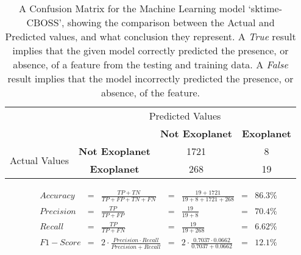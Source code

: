 
    \renewcommand{\arraystretch}{2}
    \renewcommand{\tabcolsep}{20.25pt}
    \vspace{-0.5cm}
    \begin{table}[ht]
    \begin{tabular}{cccc}
     & \multicolumn{3}{c}{Predicted Values} \\ \cline{3-4}
     & \multicolumn{1}{c|}{} & \multicolumn{1}{c|}{\textbf{Not Exoplanet}} & \multicolumn{1}{c|}{\textbf{Exoplanet}} \\ \cline{2-4}
    \multicolumn{1}{c|}{\multirow{2}{2.0cm}{Actual Values}} & \multicolumn{1}{c|}{\textbf{Not Exoplanet}} & \multicolumn{1}{c|}{1721} & \multicolumn{1}{c|}{8} \\ \cline{2-4}
    \multicolumn{1}{c|}{} & \multicolumn{1}{c|}{\textbf{Exoplanet}} & \multicolumn{1}{c|}{268} & \multicolumn{1}{c|}{19} \\ \cline{2-4}
    \end{tabular}
    \caption{A Confusion Matrix for the Machine Learning model `sktime-CBOSS', showing the comparison between the Actual and Predicted values, and what conclusion they represent. A \emph{True} result implies that the given model correctly predicted the presence, or absence, of a feature from the testing and training data. A \emph{False} result implies that the model incorrectly predicted the presence, or absence, of the feature.}
    \label{tab:sktime-CBOSSconfusionmatrix}
    \end{table}
    \vspace{-0.75cm}
    \label{eq:metrics-sktime-CBOSS}
    \begin{align*}
        Accuracy &= &\frac{TP + TN}{TP + FP + TN + FN} &= &\frac{19 + 1721}{19 + 8 + 1721 + 268} &= & 86.3\% \\
        Precision &= &\frac{TP}{TP + FP} &= &\frac{19}{19 + 8} &= & 70.4\% \\
        Recall &= &\frac{TP}{TP + FN} &= &\frac{19}{19 + 268} &= & 6.62\% \\
        F1-Score &= &2 \cdot \frac{Precision \cdot Recall}{Precision + Recall} &= &2 \cdot \frac{0.7037 \cdot 0.0662}{0.7037 + 0.0662} &= & 12.1\% \\
    \end{align*}
    \vspace{-1.75cm}
    \renewcommand{\arraystretch}{1}
    \renewcommand{\tabcolsep}{5.25pt}
    
